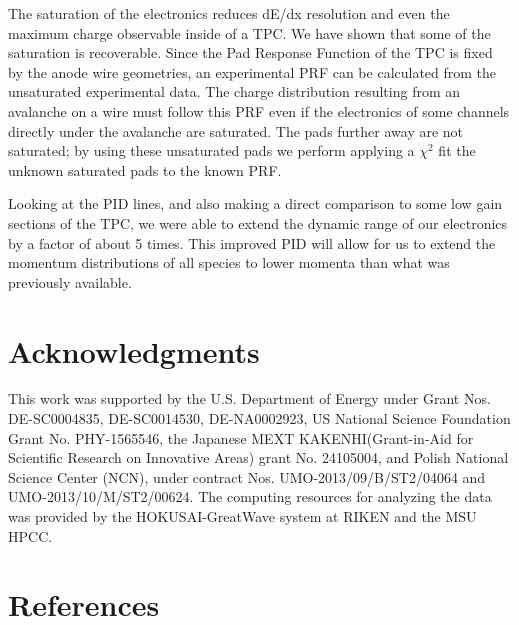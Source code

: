 \documentclass[review]{elsarticle}
\begin{document}
The saturation  of the electronics reduces dE/dx resolution and even the maximum charge observable inside of a TPC.  We have shown that some of the saturation is recoverable. Since the Pad Response Function of the TPC is fixed by the anode wire geometries, an experimental PRF can be calculated from the unsaturated experimental data. The charge distribution resulting from an avalanche on a wire must follow this PRF even if the electronics of some channels directly under the avalanche are saturated. The pads further away are not saturated; by using these unsaturated pads we perform applying a $\chi^2$  fit the unknown saturated pads to the known PRF. 

Looking at the PID lines, and also making a direct comparison to some low gain sections of the TPC, we were able to extend the dynamic range of our electronics by a factor of about 5 times. This improved PID will allow for us to extend the momentum distributions of all species to lower momenta than what was previously available. 

\section{Acknowledgments}
This work was supported by the U.S. Department of Energy under Grant Nos.  DE-SC0004835,  DE-SC0014530, DE-NA0002923,  US  National Science Foundation Grant  No.  PHY-1565546, the  Japanese  MEXT  KAKENHI(Grant-in-Aid  for  Scientific  Research  on  Innovative  Areas)  grant  No. 24105004, and Polish National Science Center (NCN), under contract Nos. UMO-2013/09/B/ST2/04064 and UMO-2013/10/M/ST2/00624. The computing resources for analyzing the data was provided by the HOKUSAI-GreatWave system at RIKEN and the MSU HPCC. 

\section*{References}


\end{document}
